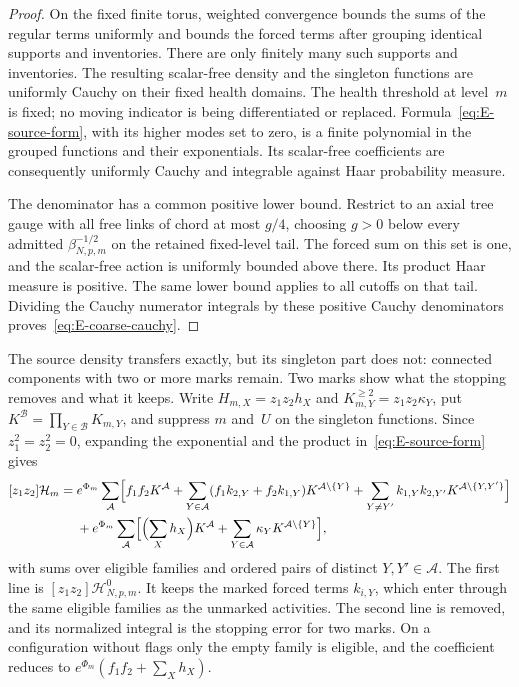 \begin{proof}
On the fixed finite torus, weighted convergence bounds the sums of the regular terms uniformly and bounds the forced terms after grouping identical supports and inventories. There are only finitely many such supports and inventories. The resulting scalar-free density and the singleton functions are uniformly Cauchy on their fixed health domains. The health threshold at level~$m$ is fixed; no moving indicator is being differentiated or replaced. Formula~\eqref{eq:E-source-form}, with its higher modes set to zero, is a finite polynomial in the grouped functions and their exponentials. Its scalar-free coefficients are consequently uniformly Cauchy and integrable against Haar probability measure.

The denominator has a common positive lower bound. Restrict to an axial tree gauge with all free links of chord at most $g/4$, choosing $g>0$ below every admitted $\beta_{N,p,m}^{-1/2}$ on the retained fixed-level tail. The forced sum on this set is one, and the scalar-free action is uniformly bounded above there. Its product Haar measure is positive. The same lower bound applies to all cutoffs on that tail. Dividing the Cauchy numerator integrals by these positive Cauchy denominators proves~\eqref{eq:E-coarse-cauchy}.
\end{proof}

The source density transfers exactly, but its singleton part does not: connected components with two or more marks remain. Two marks show what the stopping removes and what it keeps. Write $H_{m,X}=z_1z_2h_X$ and $K^{\ge2}_{m,Y}=z_1z_2\kappa_Y$, put $K^{\mathcal B}=\prod_{Y\in\mathcal B}K_{m,Y}$, and suppress $m$ and~$U$ on the singleton functions. Since $z_1^2=z_2^2=0$, expanding the exponential and the product in~\eqref{eq:E-source-form} gives
\begin{equation}\label{eq:E-two-mark}
\begin{aligned}
 [z_1z_2]\mathcal H_m={}&e^{\Phi_m}\sum_{\mathcal A}\Bigl[f_1f_2K^{\mathcal A}
 +\sum_{Y\in\mathcal A}(f_1k_{2,Y}+f_2k_{1,Y})K^{\mathcal A\setminus\{Y\}}
 +\sum_{Y\ne Y'}k_{1,Y}k_{2,Y'}K^{\mathcal A\setminus\{Y,Y'\}}\Bigr]
 \\
 &+e^{\Phi_m}\sum_{\mathcal A}\Bigl[\Bigl(\sum_Xh_X\Bigr)K^{\mathcal A}
 +\sum_{Y\in\mathcal A}\kappa_YK^{\mathcal A\setminus\{Y\}}\Bigr],
\end{aligned}
\end{equation}
with sums over eligible families and ordered pairs of distinct $Y,Y'\in\mathcal A$. The first line is $[z_1z_2]\mathcal H^0_{N,p,m}$. It keeps the marked forced terms $k_{i,Y}$, which enter through the same eligible families as the unmarked activities. The second line is removed, and its normalized integral is the stopping error for two marks. On a configuration without flags only the empty family is eligible, and the coefficient reduces to $e^{\Phi_m}(f_1f_2+\sum_Xh_X)$.

